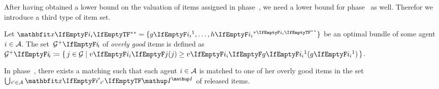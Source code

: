 After having obtained a lower bound on the valuation of items assigned in phase~\phaseii, we need a lower bound for phase~\phaseiii{} as well.
Therefor we introduce a third type of item set.
\begin{definition}
	Let \(\alloc* = \{ \asgd*{1}, \dots, \asgd{\alloclen*}\}\) be an optimal bundle of some agent \(i \in \mathcal{A}\).
	The set~\(\overlygoodset\) of \emph{overly good} items is defined as \(\overlygoodset \coloneq \{\, j \in \goods \given \valuations[j] \ge \valuations[\asgd*{1}] \,\}\).
\end{definition}

\begin{lemma}
	\label{lem:overly_good_matching}
	In phase~\phaseiii, there exists a matching such that each agent \(i \in \mathcal{A}\) is matched to one of her overly good items in the set \(\mathop{\bigcup\hspace{-1pt}_{i' \in \agents}} \alloc[\phasei][i']\) of released items.
\end{lemma}
